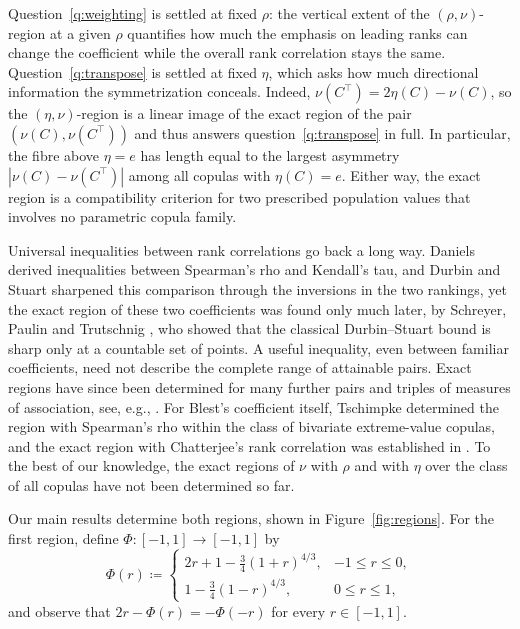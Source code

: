 \documentclass[11pt,a4paper]{article}
\theoremstyle{remark}
\newcommand{\1}{\mathbf{1}}
\begin{document}
Question~\ref{q:weighting} is settled at fixed $\rho$: the vertical extent of the $(\rho,\nu)$-region at a given $\rho$ quantifies how much the emphasis on leading ranks can change the coefficient while the overall rank correlation stays the same.
Question~\ref{q:transpose} is settled at fixed $\eta$, which asks how much directional information the symmetrization conceals.
Indeed, $\nu(C^\top)=2\eta(C)-\nu(C)$, so the $(\eta,\nu)$-region is a linear image of the exact region of the pair $(\nu(C),\nu(C^\top))$ and thus answers question~\ref{q:transpose} in full.
In particular, the fibre above $\eta=e$ has length equal to the largest asymmetry $|\nu(C)-\nu(C^\top)|$ among all copulas with $\eta(C)=e$.
Either way, the exact region is a compatibility criterion for two prescribed population values that involves no parametric copula family.

Universal inequalities between rank correlations go back a long way.
Daniels \cite{daniels1950rank} derived inequalities between Spearman's rho and Kendall's tau, and Durbin and Stuart \cite{durbin1951inversions} sharpened this comparison through the inversions in the two rankings, yet the exact region of these two coefficients was found only much later, by Schreyer, Paulin and Trutschnig \cite{schreyer2017exact}, who showed that the classical Durbin--Stuart bound is sharp only at a countable set of points.
A useful inequality, even between familiar coefficients, need not describe the complete range of attainable pairs.
Exact regions have since been determined for many further pairs and triples of measures of association, see, e.g., \cite{kokolbukovsek2021spearman,kokolbukovsek2022exact,kokolbukovsek2023exact,ansari2026rhofootrule}.
For Blest's coefficient itself, Tschimpke \cite{tschimpke2025exact} determined the region with Spearman's rho within the class of bivariate extreme-value copulas, and the exact region with Chatterjee's rank correlation was established in \cite{rockel2026exact}.
To the best of our knowledge, the exact regions of $\nu$ with $\rho$ and with $\eta$ over the class of all copulas have not been determined so far.

Our main results determine both regions, shown in Figure~\ref{fig:regions}.
For the first region, define $\Phi:[-1,1]\to[-1,1]$ by
\begin{equation}
  \label{eq:Phi-def}
  \Phi(r)\coloneqq
  \begin{cases}
    2r+1-\frac34(1+r)^{4/3}, & -1\le r\le0,\\[0.3ex]
    1-\frac34(1-r)^{4/3}, & 0\le r\le1,
  \end{cases}
\end{equation}
and observe that $2r-\Phi(r)=-\Phi(-r)$ for every $r\in[-1,1]$.
\end{document}
